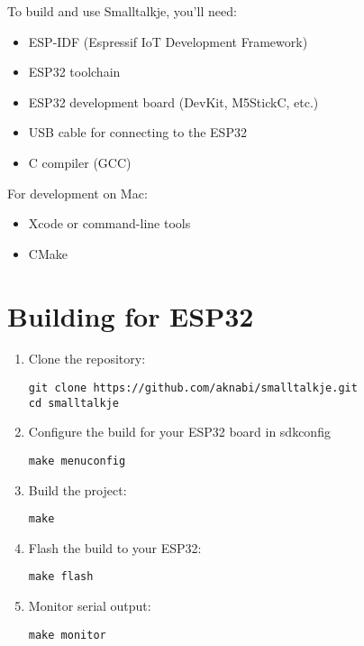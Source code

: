 \documentclass[12pt,a4paper]{report}
\begin{document}
To build and use Smalltalkje, you'll need:

\begin{itemize}
    \item ESP-IDF (Espressif IoT Development Framework)
    \item ESP32 toolchain
    \item ESP32 development board (DevKit, M5StickC, etc.)
    \item USB cable for connecting to the ESP32
    \item C compiler (GCC)
\end{itemize}

For development on Mac:
\begin{itemize}
    \item Xcode or command-line tools
    \item CMake
\end{itemize}

\section{Building for ESP32}

\begin{enumerate}
    \item Clone the repository:
    \begin{lstlisting}[style=smalltalk]
git clone https://github.com/aknabi/smalltalkje.git
cd smalltalkje
\end{lstlisting}

    \item Configure the build for your ESP32 board in sdkconfig
    \begin{lstlisting}[style=smalltalk]
make menuconfig
\end{lstlisting}

    \item Build the project:
    \begin{lstlisting}[style=smalltalk]
make
\end{lstlisting}

    \item Flash the build to your ESP32:
    \begin{lstlisting}[style=smalltalk]
make flash
\end{lstlisting}

    \item Monitor serial output:
    \begin{lstlisting}[style=smalltalk]
make monitor
\end{lstlisting}
\end{enumerate}
\end{document}
